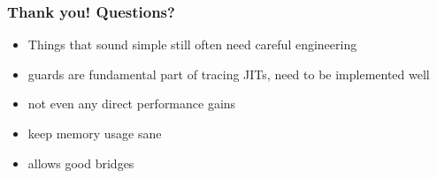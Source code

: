 \documentclass[utf8x]{beamer}
\begin{document}
\begin{frame}
  \frametitle{Thank you! Questions?}
  \begin{itemize}
      \item Things that sound simple still often need careful engineering
      \item guards are fundamental part of tracing JITs, need to be implemented well
      \item not even any direct performance gains
      \item keep memory usage sane
      \item allows good bridges
  \end{itemize}
\end{frame}

\end{document}
